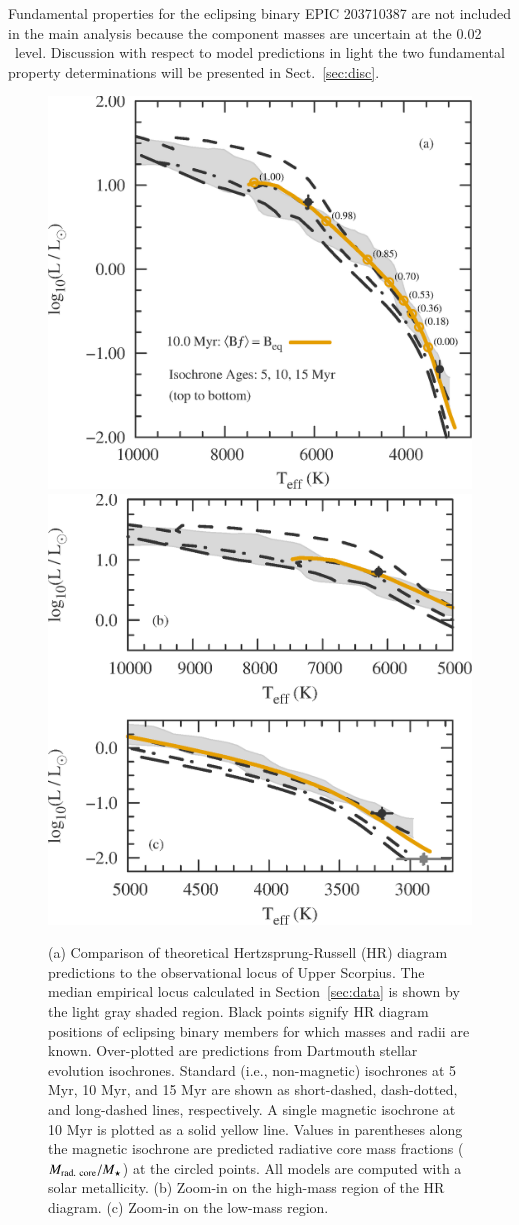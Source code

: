 \documentclass{aa}
\begin{document}
Fundamental properties for the eclipsing binary EPIC 203710387 \citep{David2016, Lodieu2015} are not included in the main analysis because the component masses are uncertain at the 0.02 \msun\ level. Discussion with respect to model predictions in light the two fundamental property determinations will be presented in Sect.~\ref{sec:disc}.

\begin{figure}[t]
    \centering
    \includegraphics[width=0.48\linewidth]{HR_diagram_age_USco.eps} \quad
    \includegraphics[width=0.43\linewidth]{HR_diagram_split_USco.eps}
    \caption{(a) Comparison of theoretical Hertzsprung-Russell (HR) diagram predictions to the observational locus of Upper Scorpius. The median empirical locus calculated in Section~\ref{sec:data} is shown by the light gray shaded region. Black points signify HR diagram positions of eclipsing binary members for which masses and radii are known. Over-plotted are predictions from Dartmouth stellar evolution isochrones. Standard (i.e., non-magnetic) isochrones at 5 Myr, 10 Myr, and 15 Myr are shown as short-dashed, dash-dotted, and long-dashed lines, respectively. A single magnetic isochrone at 10 Myr is plotted as a solid yellow line. Values in parentheses along the magnetic isochrone are predicted radiative core mass fractions ($M_{\rm rad.\ core}/M_{\star}$) at the circled points. All models are computed with a solar metallicity. (b) Zoom-in on the high-mass region of the HR diagram. (c) Zoom-in on the low-mass region.}
    \label{fig:ages}
\end{figure}
\end{document}
